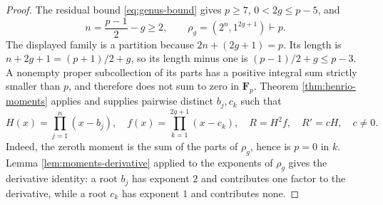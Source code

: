 \documentclass[10pt,a4paper]{amsart}
\numberwithin{equation}{section}
\begin{document}
\begin{proof}
The residual bound \eqref{eq:genus-bound} gives
$p\geq7$, $0<2g\leq p-5$, and
\[
 n=\frac{p-1}{2}-g\geq2,\qquad
 \rho_g=(2^n,1^{2g+1})\vdash p.
 \label{eq:aux-partition}
\]
The displayed family is a partition because
$2n+(2g+1)=p$.  Its length is
$n+2g+1=(p+1)/2+g$, so its length minus one is
$(p-1)/2+g\leq p-3$.  A nonempty proper subcollection of its parts has a
positive integral sum strictly smaller than $p$, and therefore does not sum
to zero in $\mathbf F_p$.  Theorem \ref{thm:henrio-moments} applies and
supplies pairwise distinct $b_j,c_k$ such that
\[
 H(x)=\prod_{j=1}^n(x-b_j),\quad
 f(x)=\prod_{k=1}^{2g+1}(x-c_k),\quad
 R=H^2f,\quad R'=cH,\quad c\neq0.
 \label{eq:new-derivative}
\]
Indeed, the zeroth moment is the sum of the parts of $\rho_g$, hence is
$p=0$ in $k$.  Lemma \ref{lem:moments-derivative} applied to the exponents
of $\rho_g$ gives the derivative identity: a root $b_j$ has exponent $2$
and contributes one factor to the derivative, while a root $c_k$ has
exponent $1$ and contributes none.


\end{proof}
\end{document}
